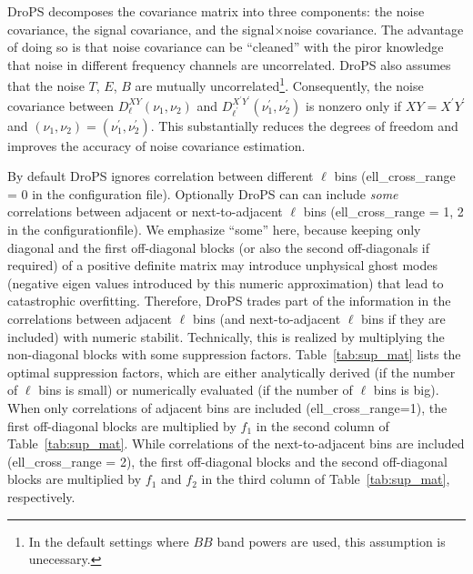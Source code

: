 \documentclass[12pt, a4paper]{ctexart} %
\begin{document}
DroPS decomposes the covariance matrix into three components: the noise covariance, the signal covariance, and the signal$\times$noise covariance. The advantage of doing so is that noise covariance can be ``cleaned'' with the piror knowledge that noise in different frequency channels are uncorrelated. DroPS also assumes that the noise $T$, $E$, $B$ are mutually uncorrelated\footnote{In the default settings where $BB$ band powers are used, this assumption is unecessary.}. Consequently, the noise covariance between $D^{XY}_\ell(\nu_1,\nu_2)$ and $D^{X^\prime Y^\prime}_{\ell^\prime}(\nu_1^\prime,\nu_2^\prime)$ is nonzero only if $XY=X^\prime Y^\prime$ and $(\nu_1, \nu_2) = (\nu_1^\prime, \nu_2^\prime)$. This substantially reduces the degrees of freedom and improves the accuracy of noise covariance estimation.

By default DroPS ignores correlation between different $\ell$ bins (ell\_cross\_range  = 0 in the configuration file). Optionally  DroPS can can include {\it some} correlations between adjacent or next-to-adjacent $\ell$ bins (ell\_cross\_range = 1, 2 in the configurationfile). We emphasize ``some'' here,  because keeping only diagonal and the first off-diagonal blocks (or also the second off-diagonals if required) of a positive definite matrix may introduce unphysical ghost modes (negative eigen values introduced by this numeric approximation) that lead to catastrophic overfitting. Therefore, DroPS trades part of the information in the correlations between adjacent $\ell$ bins (and next-to-adjacent $\ell$ bins if they are included)  with numeric stabilit. Technically, this is realized by multiplying the non-diagonal blocks with some suppression factors. Table~\ref{tab:sup_mat} lists the optimal suppression factors, which are either analytically derived (if the number of $\ell$ bins is small) or numerically evaluated (if the number of $\ell$ bins is big). When only correlations of adjacent bins are included (ell\_cross\_range=1), the first off-diagonal blocks are multiplied by $f_1$ in the second column of Table~\ref{tab:sup_mat}. While correlations of the next-to-adjacent bins are included (ell\_cross\_range = 2), the first off-diagonal blocks and the second off-diagonal blocks are multiplied by $f_1$ and $f_2$ in the third column of Table~\ref{tab:sup_mat}, respectively.
\end{document}

